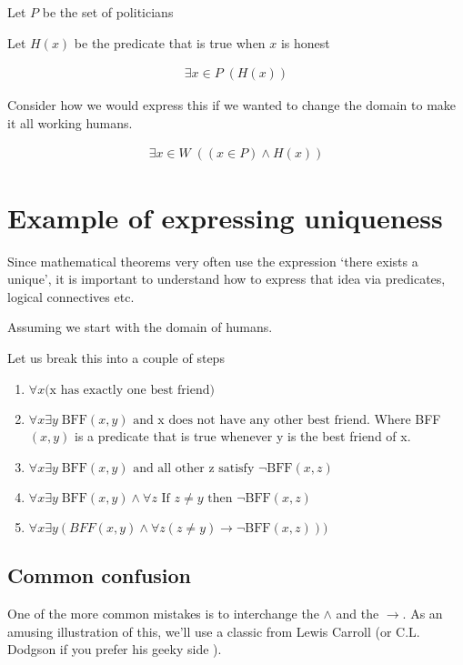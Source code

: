 \documentclass[12pt]{article}
\begin{document}
Let $P$ be the set of politicians

Let $H(x)$ be the predicate that is true when $x$ is honest

\begin{align*}
\exists x \in P \; (H(x))
\end{align*}

Consider how we would express this if we wanted to change the domain to make it all working humans. 

\begin{align*}
\exists x \in W \; ((x \in P) \wedge H(x))
\end{align*}

\section*{Example of expressing uniqueness}

Since mathematical theorems very often use the expression `there exists a unique', it is important to understand how to express that idea via predicates, logical connectives etc.

Assuming we start with the domain of humans. 


Let us break this into a couple of steps

\begin{enumerate}
\item $\forall x \text{(x has exactly one best friend)}$
\item $\forall x \exists y \; \text{BFF}(x,y) \text{ and x does not have any other best friend}$. Where BFF$(x,y)$ is a predicate that is true whenever y is the best friend of x. 
\item $\forall x \exists y \; \text{BFF} (x,y) \text{ and all other z satisfy } \neg \text{BFF}(x,z)$
\item $\forall x \exists y \; \text{BFF} (x,y) \wedge \forall z \text{ If } z \neq y \text{ then } \neg \text{BFF}(x,z)$
\item $\forall x \exists y (BFF (x,y) \wedge \forall z (z \neq y) \rightarrow \neg \text{BFF}(x,z)))$
\end{enumerate}


\subsection*{Common confusion}

One of the more common mistakes is to interchange the $\wedge$ and the $\rightarrow$. As an amusing illustration of this, we'll use a classic from Lewis Carroll (or C.L. Dodgson if you prefer his geeky side ).
\end{document}
